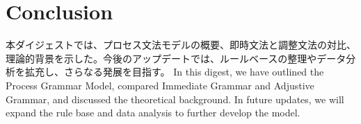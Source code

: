 \documentclass[a4paper,xelatex,ja=standard]{bxjsarticle}
\begin{document}
  \section{Conclusion}
\fi

\ifJPN
本ダイジェストでは、プロセス文法モデルの概要、即時文法と調整文法の対比、理論的背景を示した。今後のアップデートでは、ルールベースの整理やデータ分析を拡充し、さらなる発展を目指す。
\else
In this digest, we have outlined the Process Grammar Model, compared Immediate Grammar and Adjustive Grammar, and discussed the theoretical background. In future updates, we will expand the rule base and data analysis to further develop the model.
\fi

\appendix




\printbibliography
\end{document}
